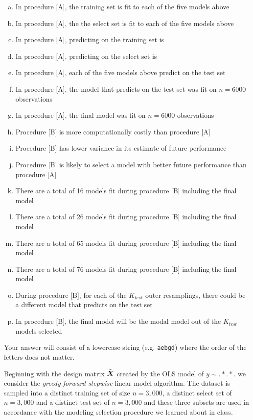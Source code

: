 \documentclass[12pt,landscape]{article}
\newcommand{\instr}{\small Your answer will consist of a lowercase string (e.g. \texttt{aebgd}) where the order of the letters does not matter. \normalsize}
\begin{document}
\begin{enumerate}[(a)]
\item In procedure [A], the training set is fit to each of the five models above
\item In procedure [A], the the select set is fit to each of the five models above
\item In procedure [A], predicting on the training set is 
\item In procedure [A], predicting on the select set is 
\item In procedure [A], each of the five models above predict on the test set
\item In procedure [A], the model that predicts on the test set was fit on $n=6000$ observations
\item In procedure [A], the final model was fit on $n=6000$ observations
\item Procedure [B] is more computationally costly than procedure [A]
\item Procedure [B] has lower variance in its estimate of future performance
\item Procedure [B] is likely to select a model with better future performance than procedure [A]
\item There are a total of 16 models fit during procedure [B] including the final model
\item There are a total of 26 models fit during procedure [B] including the final model
\item There are a total of 65 models fit during procedure [B] including the final model
\item There are a total of 76 models fit during procedure [B] including the final model
\item During procedure [B], for each of the $K_{test}$ outer resamplings, there could be a different model that predicts on the test set
\item In procedure [B], the final model will be the modal model out of the $K_{test}$ models selected
\end{enumerate}
\eenum\instr\pagebreak


\problem{}  Beginning with the design matrix $\tilde{\boldsymbol{X}}$ created by the OLS model of $y \sim . * . * .$ we consider the \emph{greedy forward stepwise} linear model algorithm. The dataset is sampled into a distinct training set of size $n=3,000$, a distinct select set of $n=3,000$ and a distinct test set of $n=3,000$ and these three subsets are used in accordance with the modeling selection procedure we learned about in class.
\end{document}

